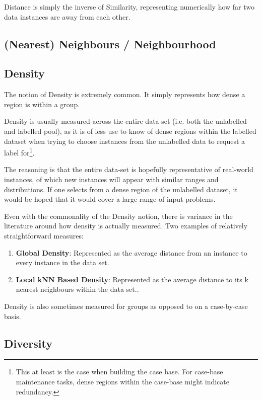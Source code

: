 \documentclass[a4paper,11pt]{report}
\begin{document}
Distance is simply the inverse of Similarity, representing numerically how far two data instances are away from each other.

\subsection{(Nearest) Neighbours / Neighbourhood}

\subsection{Density}
The notion of Density is extremely common. It simply represents how dense a region is within a group.

Density is usually measured across the entire data set (i.e. both the unlabelled and labelled pool), as it is of less use to know of dense regions within the labelled dataset when trying to choose instances from the unlabelled data to request a label for\footnote{This at least is the case when building the case base. For case-base maintenance tasks, dense regions within the case-base might indicate redundancy.}. 

The reasoning is that the entire data-set is hopefully representative of real-world instances, of which new instances will appear with similar ranges and distributions. If one selects from a dense region of the unlabelled dataset, it would be hoped that it would cover a large range of input problems.

Even with the commonality of the Density notion, there is variance in the literature around how density is actually measured. Two examples of relatively straightforward measures:
\begin{enumerate}
	\item \textbf{Global Density}: Represented as the average distance from an instance to every  instance in the data set\cite{Xu2007}.
	\item \textbf{Local kNN Based Density}: Represented as the average distance to its k nearest neighbours within the data set.\cite{Zhu2008}.
\end{enumerate}

Density is also sometimes measured for groups as opposed to on a case-by-case basis\cite{Smyth1998}.

\subsection{Diversity}
\end{document}
